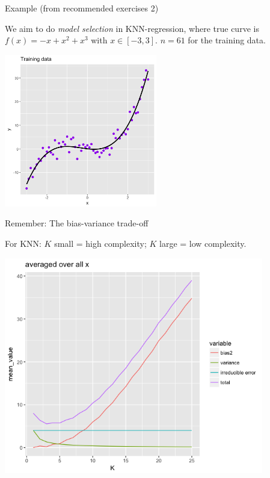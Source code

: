 \documentclass[10pt,ignorenonframetext,]{beamer}
\begin{document}
\begin{frame}

\begin{block}{Example (from recommended exercises 2)}

We aim to do \emph{model selection} in KNN-regression, where true curve
is \(f(x)=-x+x^2+x^3\) with \(x \in [-3,3]\). \(n=61\) for the training
data.

\vspace{2mm}

\centering
\includegraphics[width=0.50000\textwidth]{Prob1f1.png}

\end{block}

\end{frame}

\begin{frame}{Remember: The bias-variance trade-off}

For KNN: \(K\) small = high complexity; \(K\) large = low complexity.

\centering
\includegraphics[width=0.85000\textwidth]{Prob1f4.png}

\end{frame}
\end{document}
